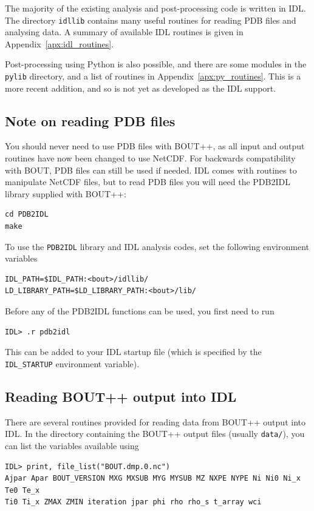 \documentclass[12pt]{article}
\newcommand{\code}[1]{\texttt{#1}}
\begin{document}
The majority of the existing analysis and post-processing code is written
in IDL. The directory \texttt{idllib} contains many useful routines for
reading PDB files and analysing data. A summary of available IDL routines
is given in Appendix~\ref{apx:idl_routines}.

Post-processing using Python is also possible, and there are some modules
in the \texttt{pylib} directory, and a list of routines in Appendix~\ref{apx:py_routines}. 
This is a more recent addition, and so is not yet as developed as the IDL support. 



\subsection{Note on reading PDB files}

You should never need to use PDB files with BOUT++, as all input and output routines have now
been changed to use NetCDF. For backwards compatibility with BOUT, PDB files can still be used
if needed. IDL comes with routines to manipulate NetCDF files, but to read PDB files you will need the PDB2IDL library
supplied with BOUT++:
\begin{verbatim}
cd PDB2IDL
make
\end{verbatim}
To use the \code{PDB2IDL} library and IDL analysis codes, set the following environment variables
\begin{verbatim}
IDL_PATH=$IDL_PATH:<bout>/idllib/
LD_LIBRARY_PATH=$LD_LIBRARY_PATH:<bout>/lib/
\end{verbatim}
Before any of the PDB2IDL functions can be used, you first need to run
\begin{verbatim}
IDL> .r pdb2idl
\end{verbatim}
This can be added to your IDL startup file (which is specified by the
\code{IDL\_STARTUP} environment variable).

\subsection{Reading BOUT++ output into IDL}
There are several routines provided for reading data from BOUT++ output into
IDL. In the directory containing the BOUT++ output files
(usually \texttt{data/}), you can list the variables available using
\begin{verbatim}
IDL> print, file_list("BOUT.dmp.0.nc")
Ajpar Apar BOUT_VERSION MXG MXSUB MYG MYSUB MZ NXPE NYPE Ni Ni0 Ni_x Te0 Te_x
Ti0 Ti_x ZMAX ZMIN iteration jpar phi rho rho_s t_array wci
\end{verbatim}
\end{document}
